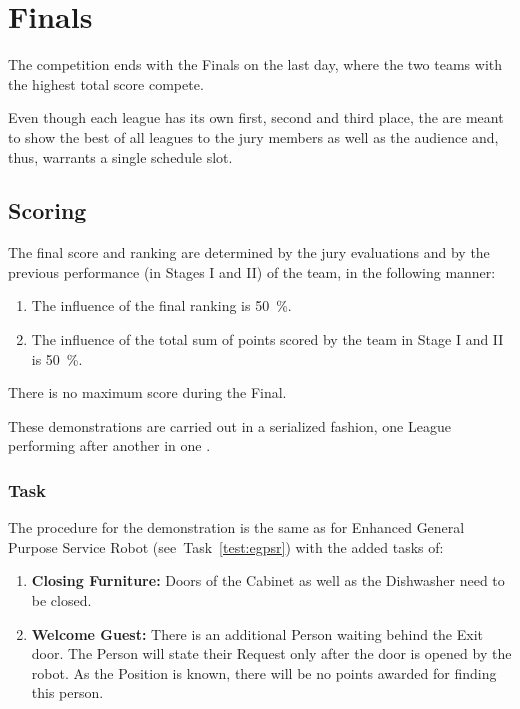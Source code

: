 \chapter{Finals}

The competition ends with the Finals on the last day, where the two teams with the highest total score compete.

Even though each league has its own first, second and third place, the  are meant to show the best of all leagues to the jury members as well as the audience and, thus, warrants a single schedule slot.

\section{Scoring}
The final score and ranking are determined by the jury evaluations and by the previous performance (in Stages I and II) of the team, in the following manner:

\begin{enumerate}
  \item The influence of the final ranking is \SI{50}{\percent}.
  \item The influence of the total sum of points scored by the team in Stage I and II is \SI{50}{\percent}.
\end{enumerate}

There is no maximum score during the Final.

These demonstrations are carried out in a serialized fashion, one League performing after another in one \Arena{}.

\subsection{Task}
The procedure for the demonstration is the same as for Enhanced General Purpose Service Robot (see~Task~\ref{test:egpsr}) with the added tasks of:

\begin{enumerate}[nosep]
\item \textbf{Closing Furniture:} Doors of the Cabinet as well as the Dishwasher need to be closed.
\item \textbf{Welcome Guest:} There is an additional Person waiting behind the Exit door. The Person will state their Request only after the door is opened by the robot. As the Position is known, there will be no points awarded for finding this person.
\end{enumerate}

